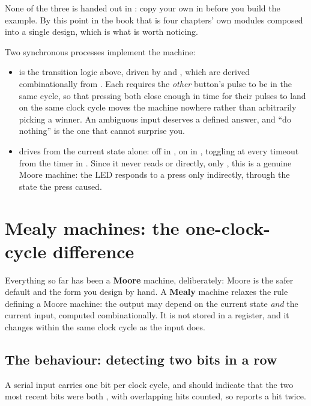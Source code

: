 None of the three is handed out in : copy your own in before you build the example.
By this point in the book that is four chapters' own modules composed into a single design, which is
what is worth noticing.


Two synchronous processes implement the machine:
\begin{itemize}
  \item {} is the  transition logic above, driven by
     and , which are derived combinationally from
    . Each requires the \emph{other} button's pulse to be  in the
    same cycle, so that pressing both close enough in time for their pulses to land on the same
    clock cycle moves the machine nowhere rather than arbitrarily picking a winner. An ambiguous
    input deserves a defined answer, and ``do nothing'' is the one that cannot surprise you.
  \item {} drives  from the current state alone: off in
    , on in , toggling at every timeout from the timer in
    . Since it never reads  or  directly, only
    , this is a genuine Moore machine: the LED responds to a press only indirectly,
    through the state the press caused.
\end{itemize}

\section{Mealy machines: the one-clock-cycle difference}
\label{c8:sec:mealy}

Everything so far has been a \textbf{Moore} machine, deliberately: Moore is the safer default and
the form you design by hand. A \textbf{Mealy} machine relaxes the rule defining a Moore machine: the
output may depend on the current state \emph{and} the current input, computed combinationally. It is
not stored in a register, and it changes within the same clock cycle as the input does.

\subsection*{The behaviour: detecting two  bits in a row}
A serial input  carries one bit per clock cycle, and  should indicate that the two
most recent bits were both , with overlapping hits counted, so  reports a hit
twice.

